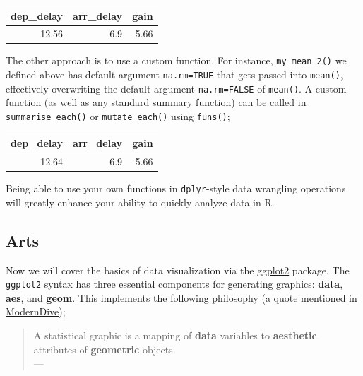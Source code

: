 \documentclass[]{book}
\newenvironment{Shaded}{\begin{snugshade}}{\end{snugshade}}
\newcommand{\KeywordTok}[1]{\textcolor[rgb]{0.13,0.29,0.53}{\textbf{{#1}}}}
\newcommand{\DataTypeTok}[1]{\textcolor[rgb]{0.13,0.29,0.53}{{#1}}}
\newcommand{\DecValTok}[1]{\textcolor[rgb]{0.00,0.00,0.81}{{#1}}}
\newcommand{\StringTok}[1]{\textcolor[rgb]{0.31,0.60,0.02}{{#1}}}
\newcommand{\NormalTok}[1]{{#1}}
\theoremstyle{definition}
\theoremstyle{definition}
\theoremstyle{remark}
\begin{document}
\begin{tabular}{r|r|r}
\hline
dep\_delay & arr\_delay & gain\\
\hline
12.56 & 6.9 & -5.66\\
\hline
\end{tabular}

The other approach is to use a custom function. For instance,
\texttt{my\_mean\_2()} we defined above has default argument
\texttt{na.rm=TRUE} that gets passed into \texttt{mean()}, effectively
overwriting the default argument \texttt{na.rm=FALSE} of
\texttt{mean()}. A custom function (as well as any standard summary
function) can be called in \texttt{summarise\_each()} or
\texttt{mutate\_each()} using \texttt{funs()};

\begin{Shaded}
\end{Shaded}

\begin{tabular}{r|r|r}
\hline
dep\_delay & arr\_delay & gain\\
\hline
12.64 & 6.9 & -5.66\\
\hline
\end{tabular}

Being able to use your own functions in \texttt{dplyr}-style data
wrangling operations will greatly enhance your ability to quickly
analyze data in R.

\subsection*{Arts}\label{arts}

Now we will cover the basics of data visualization via the
\href{http://docs.ggplot2.org/current/}{ggplot2} package. The
\texttt{ggplot2} syntax has three essential components for generating
graphics: \textbf{data}, \textbf{aes}, and \textbf{geom}. This
implements the following philosophy (a quote mentioned in
\href{https://ismayc.github.io/moderndiver-book/4-viz.html}{ModernDive});

\begin{quote}
A statistical graphic is a mapping of \textbf{data} variables to
\textbf{aesthetic} attributes of \textbf{geometric} objects.\\
--- \citep{Wilkinson2005}
\end{quote}
\end{document}

